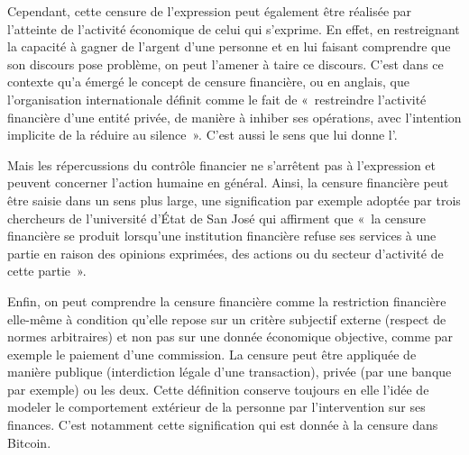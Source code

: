 Cependant, cette censure de l'expression peut également être réalisée par l'atteinte de l'activité économique de celui qui s'exprime. En effet, en restreignant la capacité à gagner de l'argent d'une personne et en lui faisant comprendre que son discours pose problème, on peut l'amener à taire ce discours. C'est dans ce contexte qu'a émergé le concept de censure financière, ou  en anglais, que l'organisation internationale  définit comme le fait de «~restreindre l'activité financière d'une entité privée, de manière à inhiber ses opérations, avec l'intention implicite de la réduire au silence~». C'est aussi le sens que lui donne l'. %

Mais les répercussions du contrôle financier ne s'arrêtent pas à l'expression et peuvent concerner l'action humaine en général. Ainsi, la censure financière peut être saisie dans un sens plus large, une signification par exemple adoptée par trois chercheurs de l'université d'État de San José qui affirment que «~la censure financière se produit lorsqu'une institution financière refuse ses services à une partie en raison des opinions exprimées, des actions ou du secteur d'activité de cette partie~». %

Enfin, on peut comprendre la censure financière comme la restriction financière elle-même à condition qu'elle repose sur un critère subjectif externe (respect de normes arbitraires) et non pas sur une donnée économique objective, comme par exemple le paiement d'une commission. La censure peut être appliquée de manière publique (interdiction légale d'une transaction), privée (par une banque par exemple) ou les deux. Cette définition conserve toujours en elle l'idée de modeler le comportement extérieur de la personne par l'intervention sur ses finances. C'est notamment cette signification qui est donnée à la censure dans Bitcoin.

